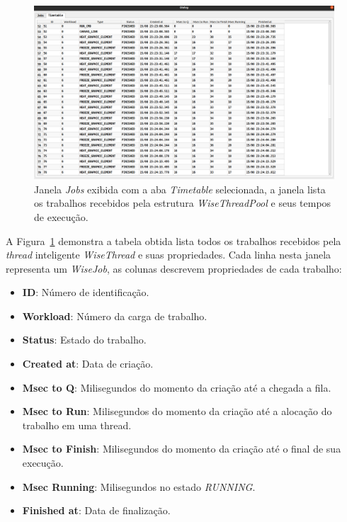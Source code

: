 \begin{figure}[!htbp]
	\centering
	\includegraphics[width=\linewidth]{Figures/IGU_023.png}
	\caption{Janela \textit{Jobs} exibida com a aba \textit{Timetable} selecionada, a janela lista os trabalhos recebidos pela estrutura \textit{WiseThreadPool} e seus tempos de execução.}
	\label{fig:jobs}
\end{figure}

A Figura~\ref{fig:jobs} demonstra a tabela obtida lista todos os trabalhos recebidos pela \textit{thread} inteligente \textit{WiseThread} e suas propriedades. Cada linha nesta janela representa um \textit{WiseJob}, as colunas descrevem propriedades de cada trabalho:

\begin{itemize}
	\item \textbf{ID}: Número de identificação.
	\item \textbf{Workload}: Número da carga de trabalho.
	\item \textbf{Status}: Estado do trabalho.
	\item \textbf{Created at}: Data de criação.
	\item \textbf{Msec to Q}: Milisegundos do momento da criação até a chegada a fila.
	\item \textbf{Msec to Run}: Milisegundos do momento da criação até a alocação do trabalho em uma thread.
	\item \textbf{Msec to Finish}: Milisegundos do momento da criação até o final de sua execução.
	\item \textbf{Msec Running}: Milisegundos no estado \textit{RUNNING}.
	\item \textbf{Finished at}: Data de finalização.
\end{itemize}

